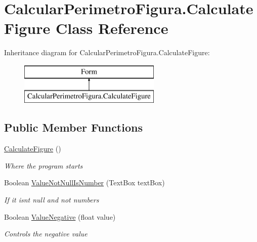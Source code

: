 \hypertarget{class_calcular_perimetro_figura_1_1_calculate_figure}{}\section{Calcular\+Perimetro\+Figura.\+Calculate\+Figure Class Reference}
\label{class_calcular_perimetro_figura_1_1_calculate_figure}
Inheritance diagram for Calcular\+Perimetro\+Figura.\+Calculate\+Figure\+:\begin{figure}[H]
\begin{center}
\leavevmode
\includegraphics[height=2.000000cm]{class_calcular_perimetro_figura_1_1_calculate_figure}
\end{center}
\end{figure}
\subsection*{Public Member Functions}
\begin{DoxyCompactItemize}
\item 
\hyperlink{class_calcular_perimetro_figura_1_1_calculate_figure_a53b9a1390f2006cfa52341a065ca595d}{Calculate\+Figure} ()
\begin{DoxyCompactList}\small\item\em Where the program starts \end{DoxyCompactList}\item 
Boolean \hyperlink{class_calcular_perimetro_figura_1_1_calculate_figure_a0a79676ef783629ba723df87802ff5ca}{Value\+Not\+Null\+Is\+Number} (Text\+Box text\+Box)
\begin{DoxyCompactList}\small\item\em If it isn\textquotesingle{}t null and not numbers \end{DoxyCompactList}\item 
Boolean \hyperlink{class_calcular_perimetro_figura_1_1_calculate_figure_ac2746ce2381d1f14e7cd601b260911fb}{Value\+Negative} (float value)
\begin{DoxyCompactList}\small\item\em Controls the negative value \end{DoxyCompactList}\end{DoxyCompactItemize}
